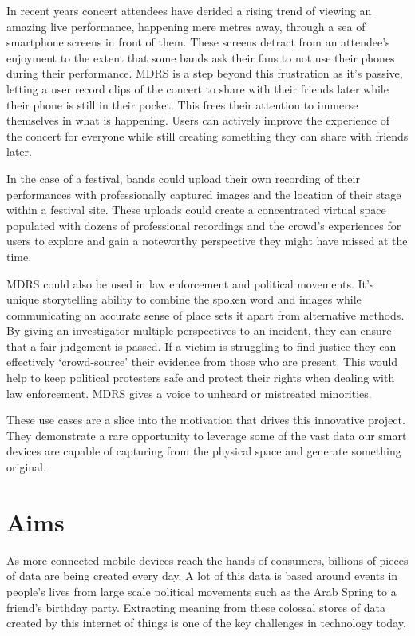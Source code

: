 \documentclass{l3proj}
\begin{document}
In recent years concert attendees have derided a rising trend of viewing an amazing live performance, happening mere metres away, through a sea of smartphone screens in front of them. These screens detract from an attendee's enjoyment to the extent that  some bands ask their fans to not use their phones during their performance. MDRS is a step beyond this frustration as it's passive, letting a user record clips of the concert to share with their friends later while their phone is still in their pocket. This frees their attention to immerse themselves in what is happening. Users can actively improve the experience of the concert for everyone while still creating something they can share with friends later.

In the case of a festival, bands could upload their own recording of their performances with professionally captured images and the location of their stage within a festival site. These uploads could create a concentrated virtual space populated with dozens of  professional recordings and the crowd’s experiences for users to explore and gain a noteworthy perspective they might have missed at the time.

MDRS could also be used in law enforcement and political movements. It's unique storytelling ability to combine the spoken word and images while communicating an accurate sense of place sets it apart from alternative methods. By giving an investigator multiple perspectives to an incident, they can ensure that a fair judgement is passed. If a victim is struggling to find justice they can effectively ‘crowd-source’ their evidence from those who are present. This would help to keep political protesters safe and protect their rights when dealing with law enforcement. MDRS gives a voice to unheard or mistreated minorities.

These use cases are a slice into the motivation that drives this innovative project. They demonstrate a rare opportunity to leverage some of the vast data our smart devices are capable of capturing from the physical space and generate something original.

\section{Aims}
As more connected mobile devices reach the hands of consumers, billions of pieces of data are being created every day\cite{gavinholt}. A lot of this data is based around events in people’s lives from large scale political movements such as the Arab Spring to a friend's birthday party. Extracting meaning from these colossal stores of data created by this internet of things is one of the key challenges in technology today.
\end{document}
